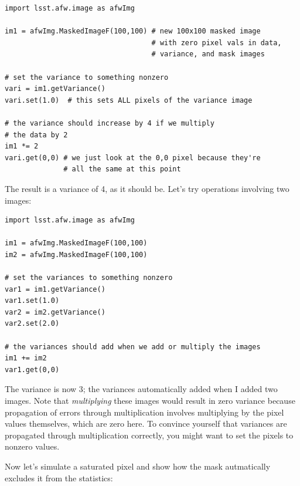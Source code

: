 \begin{verbatim}
import lsst.afw.image as afwImg

im1 = afwImg.MaskedImageF(100,100) # new 100x100 masked image
                                   # with zero pixel vals in data,
                                   # variance, and mask images

# set the variance to something nonzero
vari = im1.getVariance()
vari.set(1.0)  # this sets ALL pixels of the variance image

# the variance should increase by 4 if we multiply
# the data by 2
im1 *= 2
vari.get(0,0) # we just look at the 0,0 pixel because they're
              # all the same at this point
\end{verbatim}

The result is a variance of 4, as it should be. Let's try operations
involving two images:
\begin{verbatim}
import lsst.afw.image as afwImg

im1 = afwImg.MaskedImageF(100,100) 
im2 = afwImg.MaskedImageF(100,100) 

# set the variances to something nonzero
var1 = im1.getVariance()
var1.set(1.0)
var2 = im2.getVariance()
var2.set(2.0)

# the variances should add when we add or multiply the images
im1 += im2
var1.get(0,0) 
\end{verbatim}

The variance is now 3; the variances automatically added when I added
two images.  Note that {\it multiplying} these images would result in
zero variance because propagation of errors through multiplication
involves multiplying by the pixel values themselves, which are zero
here.  To convince yourself that variances are propagated through
multiplication correctly, you might want to set the pixels to nonzero
values.

Now let's simulate a saturated pixel and show how the mask
autmatically excludes it from the statistics:

